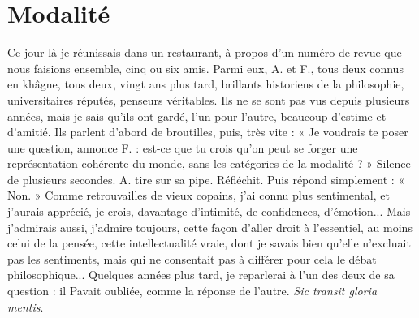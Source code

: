 \section{Modalité}
Ce jour-là je réunissais dans un restaurant, à propos d’un
numéro de revue que nous faisions ensemble, cinq ou six amis.
Parmi eux, A. et F., tous deux connus en khâgne, tous deux, vingt ans plus
tard, brillants historiens de la philosophie, universitaires réputés, penseurs véritables.
Ils ne se sont pas vus depuis plusieurs années, mais je sais qu’ils ont
gardé, l’un pour l’autre, beaucoup d’estime et d’amitié. Ils parlent d’abord de
broutilles, puis, très vite : « Je voudrais te poser une question, annonce F. : est-ce
que tu crois qu’on peut se forger une représentation cohérente du monde,
sans les catégories de la modalité ? » Silence de plusieurs secondes. A. tire sur sa
pipe. Réfléchit. Puis répond simplement : « Non. » Comme retrouvailles de
vieux copains, j'ai connu plus sentimental, et j'aurais apprécié, je crois, davantage
d'intimité, de confidences, d'émotion... Mais j’admirais aussi, j'admire
toujours, cette façon d’aller droit à l'essentiel, au moins celui de la pensée, cette
intellectualité vraie, dont je savais bien qu’elle n’excluait pas les sentiments,
mais qui ne consentait pas à différer pour cela le débat philosophique...
Quelques années plus tard, je reparlerai à l’un des deux de sa question : il Pavait
oubliée, comme la réponse de l’autre. {\it Sic transit gloria mentis}.

